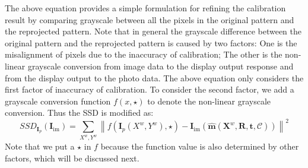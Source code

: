 \documentclass{report}
\begin{document}
The above equation provides a simple formulation for refining the calibration result by comparing grayscale between all the pixels in the original pattern and the reprojected pattern. Note that in general the grayscale difference between the original pattern and the reprojected pattern is caused by two factors: One is the misalignment of pixels due to the inaccuracy of calibration; The other is the non-linear grayscale conversion from image data to the display output response and from the display output to the photo data. The above equation only considers the first factor of inaccuracy of calibration. To consider the second factor, we add a grayscale conversion function $f(x, \star)$ to denote the non-linear grayscale conversion. Thus the SSD is modified as: 
\begin{equation}
SSD_{\mathbf{I}_p}(\mathbf{I}_\text{im}) = \sum_{X^w, Y^w} \left\| f\left( \mathbf{I}_p(X^w, Y^w), \star \right) - \mathbf{I}_\text{im}\left(\hat{\mathbf{m}}(\mathbf{X}^w, \mathbf{R}, \mathbf{t}, \mathcal{C})\right)\right\|^2\label{newSSDEqn}
\end{equation}
Note that we put a $\star$ in $f$ because the function value is also determined by other factors, which will be discussed next. 
\end{document}
